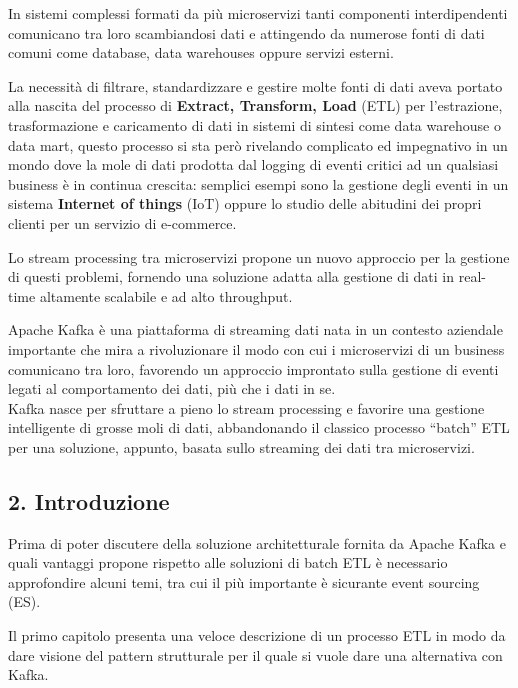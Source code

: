 \documentclass[]{article}
\begin{document}
In sistemi complessi formati da più microservizi tanti componenti
interdipendenti comunicano tra loro scambiandosi dati e attingendo da
numerose fonti di dati comuni come database, data warehouses oppure
servizi esterni.

La necessità di filtrare, standardizzare e gestire molte fonti di dati
aveva portato alla nascita del processo di \textbf{Extract, Transform,
Load} (ETL) per l'estrazione, trasformazione e caricamento di dati in
sistemi di sintesi come data warehouse o data mart, questo processo si
sta però rivelando complicato ed impegnativo in un mondo dove la mole di
dati prodotta dal logging di eventi critici ad un qualsiasi business è
in continua crescita: semplici esempi sono la gestione degli eventi in
un sistema \textbf{Internet of things} (IoT) oppure lo studio delle
abitudini dei propri clienti per un servizio di e-commerce.

Lo stream processing tra microservizi propone un nuovo approccio per la
gestione di questi problemi, fornendo una soluzione adatta alla gestione
di dati in real-time altamente scalabile e ad alto throughput.

Apache Kafka è una piattaforma di streaming dati nata in un contesto
aziendale importante che mira a rivoluzionare il modo con cui i
microservizi di un business comunicano tra loro, favorendo un approccio
improntato sulla gestione di eventi legati al comportamento dei dati,
più che i dati in se.\\
Kafka nasce per sfruttare a pieno lo stream processing e favorire una
gestione intelligente di grosse moli di dati, abbandonando il classico
processo ``batch'' ETL per una soluzione, appunto, basata sullo
streaming dei dati tra microservizi.

\newpage

\hypertarget{introduzione}{\subsection{2.
Introduzione}\label{introduzione}}

Prima di poter discutere della soluzione architetturale fornita da
Apache Kafka e quali vantaggi propone rispetto alle soluzioni di batch
ETL è necessario approfondire alcuni temi, tra cui il più importante è
sicurante event sourcing (ES).

Il primo capitolo presenta una veloce descrizione di un processo ETL in
modo da dare visione del pattern strutturale per il quale si vuole dare
una alternativa con Kafka.
\end{document}
